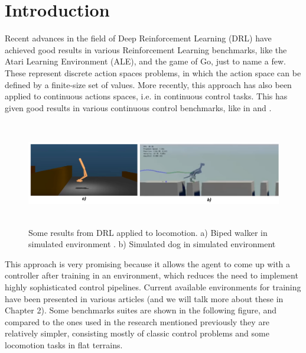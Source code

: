 \chapter{Introduction}
\label{ch:intro}


Recent advances in the field of Deep Reinforcement Learning (DRL) have achieved good
results in various Reinforcement Learning benchmarks, like the Atari Learning Environment (ALE), 
and the game of Go, just to name a few. These represent discrete action spaces problems, in which 
the action space can be defined by a finite-size set of values. More recently, this approach has also 
been applied to continuous actions spaces, i.e. in continuous control tasks. This has given good results 
in various continuous control benchmarks, like in \citeauthor{emergence-of-locomotion}  and \citeauthor{deepterrainrl}.

\begin{figure}[!ht]
	\centering
	\includegraphics[width=6.0in,height=1.8in]{./chapters/imgs/img_motivation_drl_locomotion.png}
	\caption[Motivation DRL locomotion]{Some results from DRL applied to locomotion. 
										a) Biped walker in simulated environment \citep{emergence-of-locomotion}.
										b) Simulated dog in simulated environment \citep{deepterrainrl} }
	\label{fig:motivation-drl-locomotion}
\end{figure}

This approach is very promising because it allows the agent to come up with a controller after training in
an environment, which reduces the need to implement highly sophisticated control pipelines. Current available 
environments for training have been presented in various articles (and we will talk more about these in Chapter 2).
Some benchmarks suites are shown in the following figure, and compared to the ones used in the research mentioned previously
they are relatively simpler, consisting mostly of classic control problems and some locomotion tasks in flat terrains.

